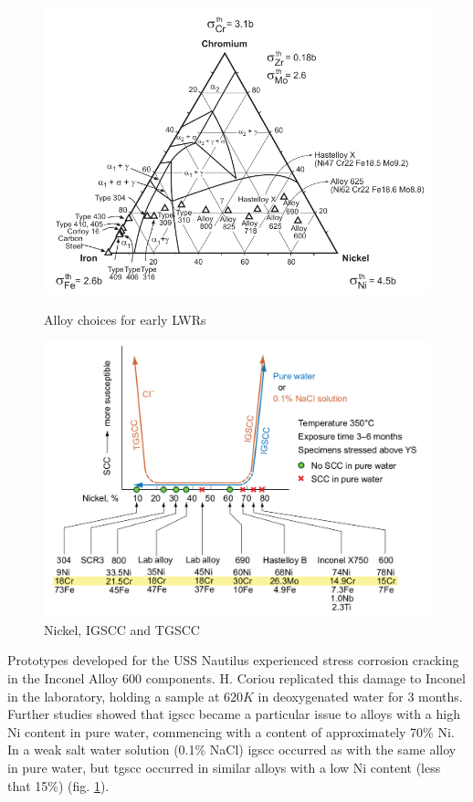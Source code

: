 \begin{figure}[h]
\centering
\begin{minipage}{.46\textwidth}
\centering
    \includegraphics[width=.8\linewidth]{chapters/austenitic_steels_in_nuclear/images/fecrnialloys.png}
    \caption{Alloy choices for early LWRs\cite{staehlecoriou12}}
    \label{fig:fecrnialloys}
\end{minipage}
\begin{minipage}{.05\textwidth}
\end{minipage}
\begin{minipage}{.46\textwidth}
\centering
    \includegraphics[width=.8\linewidth]{chapters/austenitic_steels_in_nuclear/images/tgscc_igscc_vs_nickel.png}
    \caption{Nickel, IGSCC and TGSCC\cite{staehlecoriou15}}
    \label{fig:nitgsccigscc}
\end{minipage}
\end{figure}

Prototypes developed for the USS Nautilus experienced stress corrosion cracking in the Inconel Alloy 600 components.  H. Coriou replicated this damage to Inconel in the laboratory, holding a sample at $620K$ in deoxygenated water for 3 months\cite{staehlecoriou}.  Further studies showed that \acrshort{igscc} became a particular issue to alloys with a high Ni content in pure water, commencing with a content of approximately 70\% Ni.  In a weak salt water solution (0.1\% NaCl) \acrshort{igscc} occurred as with the same alloy in pure water, but \acrshort{tgscc} occurred in similar alloys with a low Ni content (less that 15\%) (fig. \ref{fig:nitgsccigscc}).


